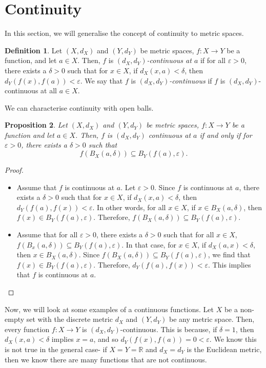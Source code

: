 \documentclass[a4paper, openany]{memoir}
\theoremstyle{definition}
\newtheorem{definition}{Definition}[section]
\theoremstyle{plain}
\newtheorem{proposition}[definition]{Proposition}
\begin{document}
\section{Continuity}
In this section, we will generalise the concept of continuity to metric spaces. \begin{definition}
Let $(X, d_X)$ and $(Y, d_Y)$ be metric spaces, $f: X \to Y$ be a function, and let $a \in X$. Then, $f$ is \emph{$(d_X, d_Y)$-continuous at $a$} if for all $\varepsilon > 0$, there exists a $\delta > 0$ such that for $x \in X$, if $d_X(x, a) < \delta$, then $d_Y(f(x), f(a)) < \varepsilon$. We say that $f$ is \emph{$(d_X, d_Y)$-continuous} if $f$ is $(d_X, d_Y)$-continuous at all $a \in X$.
\end{definition}
\noindent We can characterise continuity with open balls.
\begin{proposition}
Let $(X, d_X)$ and $(Y, d_Y)$ be metric spaces, $f: X \to Y$ be a function and let $a \in X$. Then, $f$ is $(d_X, d_Y)$ continuous at $a$ if and only if for $\varepsilon > 0$, there exists a $\delta > 0$ such that
\[f(B_X(a, \delta)) \subseteq B_Y(f(a), \varepsilon).\]
\end{proposition}
\begin{proof}
\hspace*{0pt}
\begin{itemize}
    \item Assume that $f$ is continuous at $a$. Let $\varepsilon > 0$. Since $f$ is continuous at $a$, there exists a $\delta > 0$ such that for $x \in X$, if $d_X(x, a) < \delta$, then $d_Y(f(a), f(x)) < \varepsilon$. In other words, for all $x \in X$, if $x \in B_X(a, \delta)$, then $f(x) \in B_Y(f(a), \varepsilon)$. Therefore, $f(B_X(a, \delta)) \subseteq B_Y(f(a), \varepsilon)$.
    
    \item Assume that for all $\varepsilon > 0$, there exists a $\delta > 0$ such that for all $x \in X$, $f(B_x(a, \delta)) \subseteq B_Y(f(a), \varepsilon)$. In that case, for $x \in X$, if $d_X(a, x) < \delta$, then $x \in B_X(a, \delta)$. Since $f(B_X(a, \delta)) \subseteq B_Y(f(a), \varepsilon)$, we find that $f(x) \in B_Y(f(a), \varepsilon)$. Therefore, $d_Y(f(a), f(x)) < \varepsilon$. This implies that $f$ is continuous at $a$.
\end{itemize}
\end{proof}
Now, we will look at some examples of a continuous functions. Let $X$ be a non-empty set with the discrete metric $d_X$ and $(Y, d_Y)$ be any metric space. Then, every function $f: X \to Y$ is $(d_X, d_Y)$-continuous. This is because, if $\delta = 1$, then $d_X(x, a) < \delta$ implies $x = a$, and so $d_Y(f(x), f(a)) = 0 < \varepsilon$. We know this is not true in the general case- if $X = Y = \mathbb{R}$ and $d_X = d_Y$ is the Euclidean metric, then we know there are many functions that are not continuous.
\end{document}
